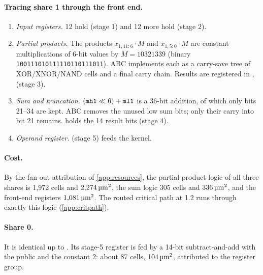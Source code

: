 \paragraph{Tracing share 1 through the front end.}
\begin{enumerate}
  \item \emph{Input registers.} 12  hold  (stage 1) and 12 more hold  (stage 2).
  \item \emph{Partial products.} The products $x_{1,11:6} \cdot M$ and $x_{1,5:0} \cdot M$ are constant multiplications of 6-bit values by $M = 10321339$ (binary \texttt{100111010111110110111011}). ABC implements each as a carry-save tree of XOR/XNOR/NAND cells and a final carry chain. Results are registered in ,  (stage 3).
  \item \emph{Sum and truncation.} $(\texttt{mh1} \ll 6) + \texttt{ml1}$ is a 36-bit addition, of which only bits 21--34 are kept. ABC removes the unused low sum bits; only their carry into bit 21 remains.  holds the 14 result bits (stage 4).
  \item \emph{Operand register.}  (stage 5) feeds the kernel.
\end{enumerate}

\paragraph{Cost.} By the fan-out attribution of \cref{app:resources}, the partial-product logic of all three shares is 1,972 cells and $2{,}274\,\si{\micro\meter\squared}$, the sum logic 305 cells and $336\,\si{\micro\meter\squared}$, and the front-end registers $1{,}081\,\si{\micro\meter\squared}$. The routed critical path at 1.2\ns{} runs through exactly this logic (\cref{app:critpath}).

\paragraph{Share 0.} It is identical up to . Its stage-5 register is fed by a 14-bit subtract-and-add with the public  and the constant 2: about 87 cells, $104\,\si{\micro\meter\squared}$, attributed to the  register group.

